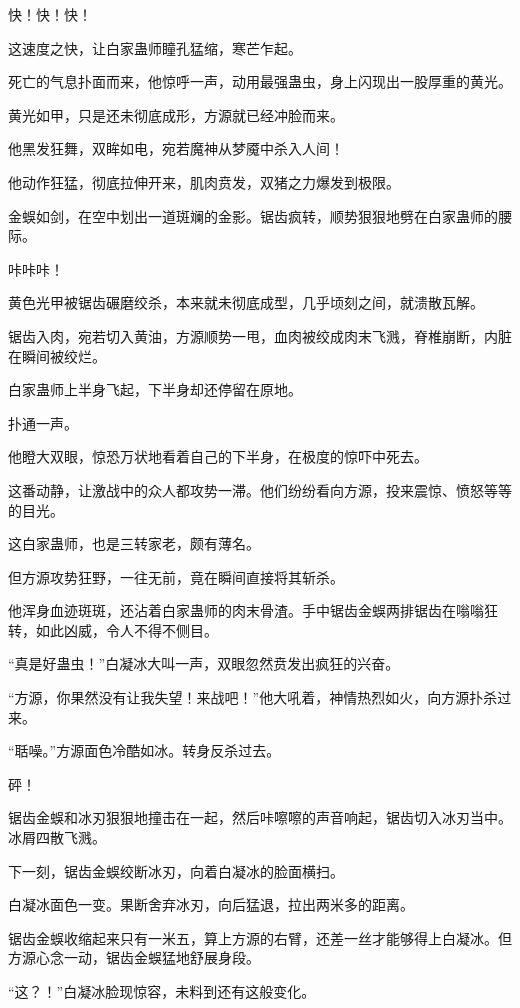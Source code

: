 \begin{this_body}
快！快！快！

这速度之快，让白家蛊师瞳孔猛缩，寒芒乍起。

死亡的气息扑面而来，他惊呼一声，动用最强蛊虫，身上闪现出一股厚重的黄光。

黄光如甲，只是还未彻底成形，方源就已经冲脸而来。

他黑发狂舞，双眸如电，宛若魔神从梦魇中杀入人间！

他动作狂猛，彻底拉伸开来，肌肉贲发，双猪之力爆发到极限。

金蜈如剑，在空中划出一道斑斓的金影。锯齿疯转，顺势狠狠地劈在白家蛊师的腰际。

咔咔咔！

黄色光甲被锯齿碾磨绞杀，本来就未彻底成型，几乎顷刻之间，就溃散瓦解。

锯齿入肉，宛若切入黄油，方源顺势一甩，血肉被绞成肉末飞溅，脊椎崩断，内脏在瞬间被绞烂。

白家蛊师上半身飞起，下半身却还停留在原地。

扑通一声。

他瞪大双眼，惊恐万状地看着自己的下半身，在极度的惊吓中死去。

这番动静，让激战中的众人都攻势一滞。他们纷纷看向方源，投来震惊、愤怒等等的目光。

这白家蛊师，也是三转家老，颇有薄名。

但方源攻势狂野，一往无前，竟在瞬间直接将其斩杀。

他浑身血迹斑斑，还沾着白家蛊师的肉末骨渣。手中锯齿金蜈两排锯齿在嗡嗡狂转，如此凶威，令人不得不侧目。

“真是好蛊虫！”白凝冰大叫一声，双眼忽然贲发出疯狂的兴奋。

“方源，你果然没有让我失望！来战吧！”他大吼着，神情热烈如火，向方源扑杀过来。

“聒噪。”方源面色冷酷如冰。转身反杀过去。

砰！

锯齿金蜈和冰刃狠狠地撞击在一起，然后咔嚓嚓的声音响起，锯齿切入冰刃当中。冰屑四散飞溅。

下一刻，锯齿金蜈绞断冰刃，向着白凝冰的脸面横扫。

白凝冰面色一变。果断舍弃冰刃，向后猛退，拉出两米多的距离。

锯齿金蜈收缩起来只有一米五，算上方源的右臂，还差一丝才能够得上白凝冰。但方源心念一动，锯齿金蜈猛地舒展身段。

“这？！”白凝冰脸现惊容，未料到还有这般变化。


\end{this_body}
